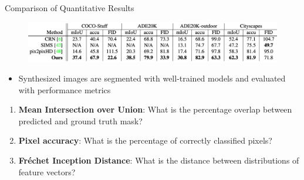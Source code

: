 \documentclass{beamer}
\begin{document}
\begin{frame}{Comparison of Quantitative Results}
    \begin{figure}
        \centering
        \includegraphics[width=0.93\linewidth]{figures/quant_results.png}
    \end{figure}
    
    \begin{itemize}
        \item Synthesized images are segmented with well-trained models and evaluated with performance metrics
    \end{itemize}
    \begin{enumerate}
        \item \textbf{Mean Intersection over Union}: What is the percentage overlap between predicted and ground truth mask?
        \item \textbf{Pixel accuracy}: What is the percentage of correctly classified pixels?
        \item \textbf{Fr\'{e}chet Inception Distance}: What is the distance between distributions of feature vectors?
    \end{enumerate}
\end{frame}
\end{document}
